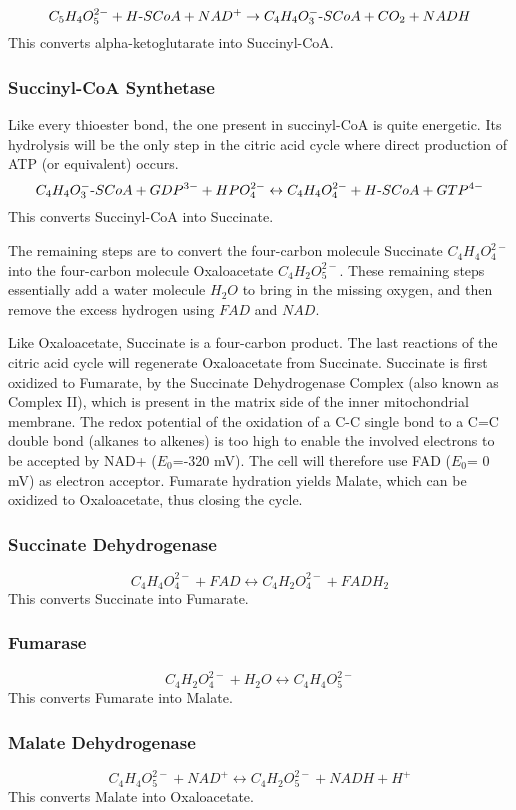 \documentclass{article}
\def\mhyphen{{\hbox{-}}}
\begin{document}
\[
    C_5H_4O_5^{2-} + H{\mhyphen}SCoA + NAD^+ \rightarrow
    C_4H_4O_3^{-}{\mhyphen}SCoA + CO_2 + NADH
\]
This converts alpha-ketoglutarate into Succinyl-CoA.

\subsubsection{Succinyl-CoA Synthetase}
Like every thioester bond, the one present in succinyl-CoA is quite energetic. Its
hydrolysis will be the only step in the citric acid cycle where direct production of ATP
(or equivalent) occurs.
\[
    C_4H_4O_3^{-}{\mhyphen}SCoA + GDP^{3-} + HPO_4^{2-} \leftrightarrow
    C_4H_4O_4^{2-} + H{\mhyphen}SCoA + GTP^{4-}
\]
This converts Succinyl-CoA into Succinate.

The remaining steps are to convert the four-carbon molecule Succinate $C_4H_4O_4^{2-}$
into the four-carbon molecule Oxaloacetate $C_4H_2O_5^{2-}$. These remaining steps
essentially add a water molecule $H_2O$ to bring in the missing oxygen, and then remove
the excess hydrogen using $FAD$ and $NAD$.

Like Oxaloacetate, Succinate is a four-carbon product. The last reactions of the citric
acid cycle will regenerate Oxaloacetate from Succinate. Succinate is first oxidized to
Fumarate, by the Succinate Dehydrogenase Complex (also known as Complex II), which is
present in the matrix side of the inner mitochondrial membrane. The redox potential of the
oxidation of a C-C single bond to a C=C double bond (alkanes to alkenes) is too high to
enable the involved electrons to be accepted by NAD+ ($E_0$=-320 mV). The cell will therefore
use FAD ($E_0$= 0 mV) as electron acceptor. Fumarate hydration yields Malate, which can be
oxidized to Oxaloacetate, thus closing the cycle.

\subsubsection{Succinate Dehydrogenase}
\[
    C_4H_4O_4^{2-} + FAD \leftrightarrow C_4H_2O_4^{2-} + FADH_2
\]
This converts Succinate into Fumarate.

\subsubsection{Fumarase}
\[
    C_4H_2O_4^{2-} + H_2O \leftrightarrow C_4H_4O_5^{2-}
\]
This converts Fumarate into Malate.

\subsubsection{Malate Dehydrogenase}\label{sec_malate_dehydrogenase}
\[
    C_4H_4O_5^{2-} + NAD^+ \leftrightarrow C_4H_2O_5^{2-} + NADH + H^+
\]
This converts Malate into Oxaloacetate.
\end{document}
